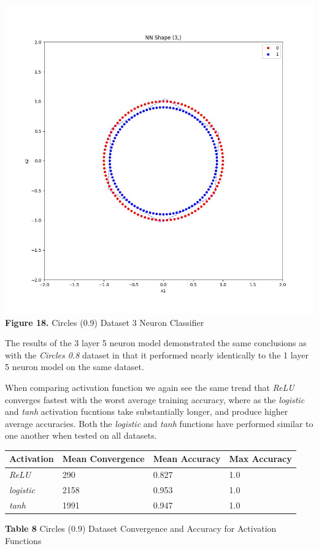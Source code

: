\documentclass[11pt]{article}
\begin{document}
\includegraphics{figures/cir09_3_clf.jpg}\\
\textbf{Figure 18.} Circles (0.9) Dataset 3 Neuron Classifier

The results of the 3 layer 5 neuron model demonstrated the same
conclusions as with the \emph{Circles 0.8} dataset in that it performed
nearly identically to the 1 layer 5 neuron model on the same dataset.

When comparing activation function we again see the same trend that
\emph{ReLU} converges fastest with the worst average training accuracy,
where as the \emph{logistic} and \emph{tanh} activation fucntions take
substantially longer, and produce higher average accuracies. Both the
\emph{logistic} and \emph{tanh} functions have performed similar to one
another when tested on all datasets.

\begin{longtable}[]{@{}llll@{}}
\toprule
Activation & Mean Convergence & Mean Accuracy & Max Accuracy \\
\midrule
\endhead
\emph{ReLU} & 290 & 0.827 & 1.0 \\
\emph{logistic} & 2158 & 0.953 & 1.0 \\
\emph{tanh} & 1991 & 0.947 & 1.0 \\
\bottomrule
\end{longtable}

\textbf{Table 8} Circles (0.9) Dataset Convergence and Accuracy for
Activation Functions


    
    
    
\end{document}
